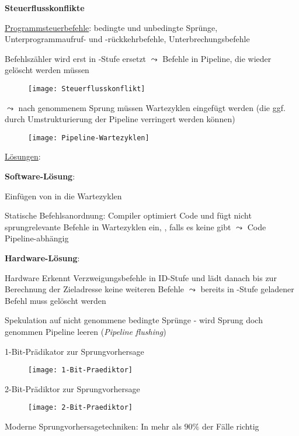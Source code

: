 \textbf{Steuerflusskonflikte}
\begin{items}
  \item \underline{Programmsteuerbefehle}: bedingte und unbedingte Sprünge, Unterprogrammaufruf- und -rückkehrbefehle, Unterbrechungsbefehle
  \item Befehlszähler wird erst in -Stufe ersetzt \( \leadsto \) Befehle in Pipeline, die wieder gelöscht werden müssen
  \begin{figure}[H]\centering\label{Steuerflusskonflikt}\texttt{[image: Steuerflusskonflikt]}\end{figure}
  \item \( \leadsto \) nach genommenem Sprung müssen Wartezyklen eingefügt werden (die ggf. durch Umstrukturierung der Pipeline verringert werden können)
  \begin{figure}[H]\centering\label{Pipeline-Wartezyklen}\texttt{[image: Pipeline-Wartezyklen]}\end{figure}

  \item \underline{Lösungen}:
  \begin{enumeration}
    \item \textbf{Software-Lösung}:
    \begin{enumeration}
      \item Einfügen von  in die Wartezyklen
      \item Statische Befehlsanordnung: Compiler optimiert Code und fügt nicht sprungrelevante Befehle in Wartezyklen ein, , falls es keine gibt \( \leadsto \) Code Pipeline-abhängig
    \end{enumeration}
    \item \textbf{Hardware-Lösung}:
    \begin{enumeration}
      \item Hardware Erkennt Verzweigungsbefehle in ID-Stufe und lädt danach bis zur Berechnung der Zieladresse keine weiteren Befehle \( \leadsto \) bereits in -Stufe geladener Befehl muss gelöscht werden
      \item Spekulation auf nicht genommene bedingte Sprünge - wird Sprung doch genommen Pipeline leeren (\emph{Pipeline flushing})
      \item 1-Bit-Prädikator zur Sprungvorhersage
      \begin{figure}[H]\centering\label{1-Bit-Praediktor}\texttt{[image: 1-Bit-Praediktor]}\end{figure}
      \item 2-Bit-Prädiktor zur Sprungvorhersage
      \begin{figure}[H]\centering\label{2-Bit-Praediktor}\texttt{[image: 2-Bit-Praediktor]}\end{figure}
      \item Moderne Sprungvorhersagetechniken: In mehr als \( 90\% \) der Fälle richtig
    \end{enumeration}
  \end{enumeration}
\end{items}